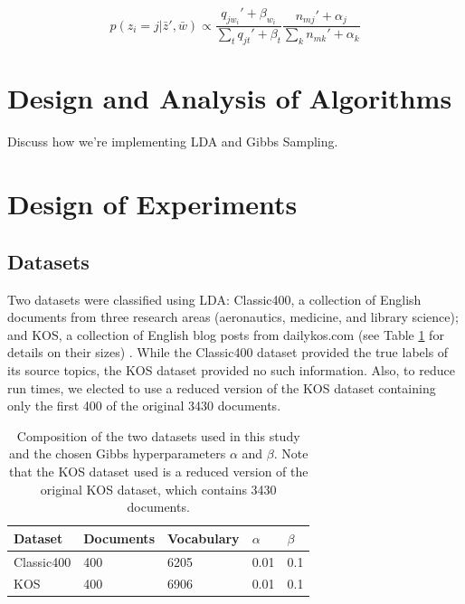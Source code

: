 \documentclass[10pt]{article}
\newcommand{\ra}[1]{\renewcommand{\arraystretch}{#1}}
\begin{document}
\begin{equation}
    p(z_i = j | \bar{z}', \bar{w}) \propto \frac{q_{j w_i}' + \beta_{w_i}}{\sum_t q_{jt}' + \beta_t} \frac{n_{mj}' + \alpha_j}{\sum_k n_{mk}' + \alpha_k}
\end{equation}



\section{Design and Analysis of Algorithms}
\label{sec:algorithms}

Discuss how we're implementing LDA and Gibbs Sampling.



\section{Design of Experiments}
\label{sec:experiments}

%
%
\subsection{Datasets}
Two datasets were classified using LDA: Classic400, a collection of English documents from three research areas (aeronautics, medicine, and library science); and KOS, a collection of English blog posts from dailykos.com (see Table \ref{tab:datasets} for details on their sizes) \cite{Classic400, KOS_dataset}. While the Classic400 dataset provided the true labels of its source topics, the KOS dataset provided no such information. Also, to reduce run times, we elected to use a reduced version of the KOS dataset containing only the first 400 of the original 3430 documents.


\begin{table}[t]
    \centering
    \ra{1.2}
    \begin{tabular}{@{} l l l l l @{}}
        \toprule
        \bf{Dataset} & \bf{Documents} & \bf{Vocabulary} & $\alpha$ & $\beta$ \\
        \midrule
        Classic400 & 400 & 6205 & 0.01 & 0.1 \\
        KOS        & 400 & 6906 & 0.01 & 0.1\\
        \bottomrule
    \end{tabular}
    \caption{Composition of the two datasets used in this study and the chosen Gibbs hyperparameters $\alpha$ and $\beta$. Note that the KOS dataset used is a reduced version of the original KOS dataset, which contains 3430 documents.}
    \label{tab:datasets}
\end{table}
\end{document}

